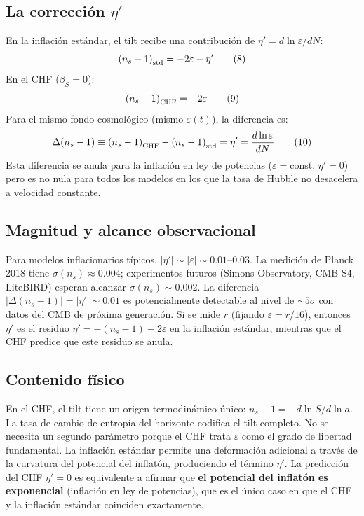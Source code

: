 \documentclass[12pt,a4paper]{article}
\begin{document}
\subsection{La corrección $\eta'$}

En la inflación estándar, el tilt recibe una contribución de $\eta' = d\ln\varepsilon/dN$:
\begin{equation}
\left(n_s - 1\right)_{\rm std} = -2\varepsilon - \eta' \tag{8}
\end{equation}
En el CHF ($\beta_S = 0$):
\begin{equation}
\left(n_s - 1\right)_{\rm CHF} = -2\varepsilon \tag{9}
\end{equation}
Para el mismo fondo cosmológico (mismo $\varepsilon(t)$), la diferencia es:
\begin{equation}
\Delta(n_s - 1) \equiv \left(n_s - 1\right)_{\rm CHF} - \left(n_s - 1\right)_{\rm std} = \eta' = \frac{d\ln\varepsilon}{dN} \tag{10}
\end{equation}
Esta diferencia se anula para la inflación en ley de potencias ($\varepsilon = \text{const}$, $\eta' = 0$) pero es no nula para todos los modelos en los que la tasa de Hubble no desacelera a velocidad constante.

\subsection{Magnitud y alcance observacional}

Para modelos inflacionarios típicos, $|\eta'| \sim |\varepsilon| \sim 0.01$--$0.03$. La medición de Planck 2018 tiene $\sigma(n_s) \approx 0.004$; experimentos futuros (Simons Observatory, CMB-S4, LiteBIRD) esperan alcanzar $\sigma(n_s) \sim 0.002$. La diferencia $|\Delta(n_s-1)| = |\eta'| \sim 0.01$ es potencialmente detectable al nivel de $\sim 5\sigma$ con datos del CMB de próxima generación. Si se mide $r$ (fijando $\varepsilon = r/16$), entonces $\eta'$ es el residuo $\eta' = -(n_s - 1) - 2\varepsilon$ en la inflación estándar, mientras que el CHF predice que este residuo se anula.

\subsection{Contenido físico}

En el CHF, el tilt tiene un origen termodinámico único: $n_s - 1 = -d\ln S/d\ln a$. La tasa de cambio de entropía del horizonte codifica el tilt completo. No se necesita un segundo parámetro porque el CHF trata $\varepsilon$ como el grado de libertad fundamental. La inflación estándar permite una deformación adicional a través de la curvatura del potencial del inflatón, produciendo el término $\eta'$. La predicción del CHF $\eta' = 0$ es equivalente a afirmar que \textbf{el potencial del inflatón es exponencial} (inflación en ley de potencias), que es el único caso en que el CHF y la inflación estándar coinciden exactamente.
\end{document}
